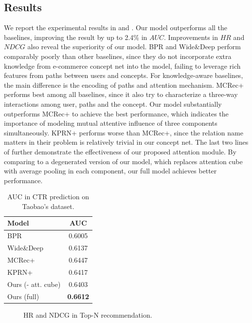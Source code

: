 \subsection{Results}
\label{sec:off_eval}

We report the experimental results in  and .
Our model outperforms all the baselines, improving the result by up to 2.4\% in $AUC$.
Improvements in $HR$ and $NDCG$ also reveal the superiority of our model.
BPR and Wide\&Deep perform comparably poorly than other baselines, since they do not incorporate extra knowledge from e-commerce concept net into the model, failing to leverage rich features from paths between users and concepts.
For knowledge-aware baselines, 
the main difference is the encoding of paths and attention mechanism.
MCRec+ performs best among all baselines, 
since it also try to characterize a three-way interactions among user, paths and the concept.
Our model substantially outperforms MCRec+ to achieve the best performance,
which indicates the importance of modeling mutual attentive influence of three components simultaneously.
KPRN+ performs worse than MCRec+, since the relation name matters in their problem is relatively trivial in our concept net.
The last two lines of  further demonstrate the effectiveness of our proposed attention module. 
By comparing to a degenerated version of our model, which replaces attention cube with average pooling in each component, 
our full model achieves better performance.

\begin{table}[th]
	\centering
	\begin{tabular}{l|c}
		\hline
		Model &   AUC \\
		\hline
		BPR  &  0.6005 \\
		Wide\&Deep  &  0.6137 \\
		MCRec+  &  0.6447 \\
		KPRN+  &  0.6417 \\
		\hline
		Ours (- att. cube) & 0.6403 \\ 
		Ours (full) &  \textbf{0.6612} \\
		\hline
	\end{tabular}
	\caption{AUC in CTR prediction on Taobao's dataset.}
	\label{tab:eval_main}
\end{table}

\begin{figure}[th]
	\centering
	\caption{HR and NDCG in Top-N recommendation.}
	\label{fig:topn}
\end{figure}



